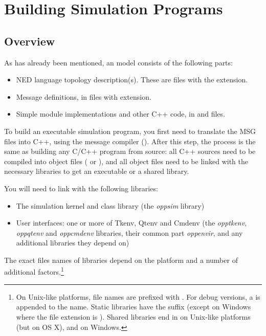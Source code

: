 \chapter{Building Simulation Programs}
\label{cha:build-sim-progs}

\section{Overview}
\label{sec:build-sim-progs:overview}

As has already been mentioned, an {\opp} model consists of
the following parts:

\begin{itemize}
  \item NED language topology description(s). These are files
        with the  extension.
  \item Message definitions, in files with  extension.
  \item Simple module implementations and other C++ code, in  and  files.
\end{itemize}

To build an executable simulation program, you first need to translate the
MSG files into C++, using the message compiler
(). After this step, the process is the same as building any
C/C++ program from source: all C++ sources need to be compiled into object
files ( or ), and all object files need to be linked
with the necessary libraries to get an executable or a shared library.

You will need to link with the following libraries:

\begin{itemize}
  \item The simulation kernel and class library (the \textit{oppsim} library)
  \item User interfaces: one or more of Tkenv, Qtenv and Cmdenv (the \textit{opptkenv},
        \textit{oppqtenv} and \textit{oppcmdenv} libraries, their common part \textit{oppenvir},
        and any additional libraries they depend on)
\end{itemize}

The exact files names of libraries depend on the platform and a number of
additional factors.\footnote{On Unix-like platforms, file names are
prefixed with . For debug versions, a  is appended to the
name. Static libraries have the  suffix (except on Windows where
the file extension is ). Shared libraries end in  on
Unix-like platforms (but  on OS X), and  on Windows.}

